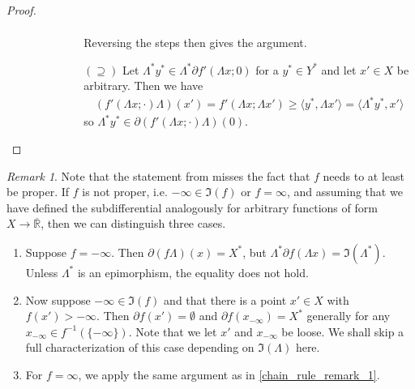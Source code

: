 \documentclass[10pt, leqno]{amsart}
\theoremstyle{definition}
\theoremstyle{remark}
\newtheorem{remark}[theorem]{Remark}
\begin{document}
\begin{proof}
\begin{enumerate}[label=(\roman*), wide]
\begin{enumerate}[label=(\alph*), wide]
\begin{enumerate}[label=(\arabic*), wide]
\begin{itemize}[wide]
\begin{align}
                        \end{align}
                        Reversing the steps then gives the argument.
                        \item[\((\supseteq)\)] Let \(\Lambda^*y^* \in \Lambda^*\partial f'(\Lambda x; 0)\) for a \(y^* \in Y^*\) and let \(x' \in X\) be arbitrary. Then we have
                        \begin{align}
                            (f'(\Lambda x; \cdot)\Lambda)(x') = f'(\Lambda x; \Lambda x') \geq \langle y^*, \Lambda x' \rangle = \langle \Lambda^* y^*, x' \rangle
                        \end{align}
                        so \(\Lambda^* y^* \in \partial (f'(\Lambda x; \cdot) \Lambda) (0)\).
                    \end{itemize}
                \end{enumerate}
            \end{enumerate}
        \end{enumerate}
    \end{proof}

    \begin{remark}
        Note that the statement from \cite[p. 201]{IoffeTihomirov} misses the fact that \(f\) needs to at least be proper. If \(f\) is not proper, i.e. \(-\infty \in \Im(f)\) or \(f = \infty\), and assuming that we have defined the subdifferential analogously for arbitrary functions of form \(X \to \overline{\mathbb{R}}\), then we can distinguish three cases.
        \begin{enumerate}[label=(\roman*), wide]
            \item \label{chain_rule_remark_1} Suppose \(f = -\infty\). Then \(\partial (f\Lambda)(x) = X^*\), but \(\Lambda^* \partial f(\Lambda x) = \Im(\Lambda^*)\). Unless \(\Lambda^*\) is an epimorphism, the equality does not hold.
            \item Now suppose \(-\infty \in \Im(f)\) and that there is a point \(x' \in X\) with \(f(x') > -\infty\). Then \(\partial f(x') = \emptyset\) and \(\partial f(x_{-\infty}) = X^*\) generally for any \(x_{-\infty} \in f^{-1}(\{-\infty\})\). Note that we let \(x'\) and \(x_{-\infty}\) be loose. We shall skip a full characterization of this case depending on \(\Im(\Lambda)\) here.
            \item For \(f = \infty\), we apply the same argument as in \ref{chain_rule_remark_1}.
        \end{enumerate}
    \end{remark}
\end{document}
